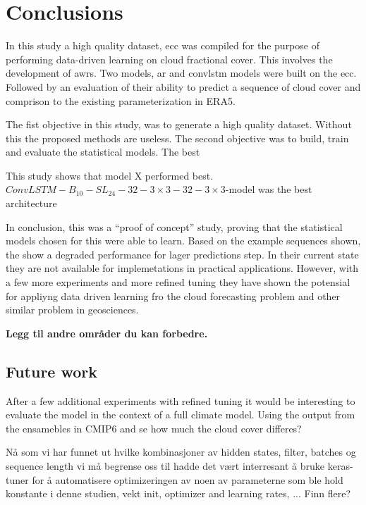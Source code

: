\chapter{Conclusions}
In this study a high quality dataset, \acrfull{ecc} was compiled for the purpose of performing data-driven learning on cloud fractional cover. This involves the development of \acrfull{awrs}. %
Two models, \acrfull{ar} and \acrfull{convlstm} models were built on the \acrshort{ecc}. Followed by an evaluation of their ability to predict a sequence of cloud cover and comprison to the existing parameterization in ERA5. 

The fist objective in this study, was to generate a high quality dataset. Without this the proposed methods are useless. The second objective was to build, train and evaluate the statistical models. 
The best  

This study shows that model X performed best. $ConvLSTM-B_{10}-SL_{24}-32-3\times3-32-3 \times3$-model was the best architecture 


In conclusion, this was a ``proof of concept'' study, proving that the statistical models chosen for this were able to learn. Based on the example sequences shown, the show a degraded performance for lager predictions step. In their current state they are not available for implemetations in practical applications. However, with a few more experiments and more refined tuning they have shown the potensial for appliyng data driven learning fro the cloud forecasting problem and other similar problem in geosciences. 

\textbf{Legg til andre områder du kan forbedre. }


\section{Future work}

After a few additional experiments with refined tuning it would be interesting to evaluate the model in the context of a full climate model. Using the output from the ensamebles in CMIP6 and se how much the cloud cover differes?

Nå som vi har funnet ut hvilke kombinasjoner av hidden states, filter, batches og sequence length vi må begrense oss til hadde det vært interresant å bruke keras-tuner for å automatisere optimizeringen av noen av parameterne som ble hold konstante i denne studien, vekt init, optimizer and learning rates, ... Finn flere?

